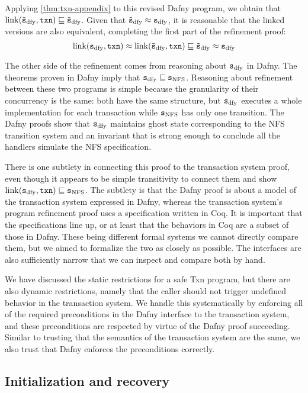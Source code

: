 Applying \cref{thm:txn-appendix} to this revised Dafny program, we obtain that
$\mathrm{link}(\tilde{\texttt{s}}_{\mathrm{dfy}}, \texttt{txn}) \sqsubseteq \tilde{\texttt{s}}_{\mathrm{dfy}}$. Given that $\tilde{\texttt{s}}_{\mathrm{dfy}} \approx \texttt{s}_{\mathrm{dfy}}$, it is
reasonable that the linked versions are also equivalent, completing the first
part of the refinement proof:
\[
  \mathrm{link}(\texttt{s}_{\mathrm{dfy}}, \texttt{txn}) \approx \mathrm{link}(\tilde{\texttt{s}}_{\mathrm{dfy}}, \texttt{txn}) \sqsubseteq \tilde{\texttt{s}}_{\mathrm{dfy}} \approx \texttt{s}_{\mathrm{dfy}}
\]

The other side of the refinement comes from reasoning about $\texttt{s}_{\mathrm{dfy}}$ in Dafny.
The theorems proven in Dafny imply that $\texttt{s}_{\mathrm{dfy}} \sqsubseteq \texttt{s}_{\mathrm{NFS}}$. Reasoning about
refinement between these two programs is simple because the granularity of their
concurrency is the same: both have the same structure, but $\texttt{s}_{\mathrm{dfy}}$ executes a
whole implementation for each transaction while $\texttt{s}_{\mathrm{NFS}}$ has only one transition.
The Dafny proofs show that $\texttt{s}_{\mathrm{dfy}}$ maintains ghost state corresponding to the
NFS transition system and an invariant that is strong enough to conclude all the
handlers simulate the NFS specification.

There is one subtlety in connecting this proof to the transaction system proof,
even though it appears to be simple transitivity to connect them and show
$\mathrm{link}(\texttt{s}_{\mathrm{dfy}}, \texttt{txn}) \sqsubseteq \texttt{s}_{\mathrm{NFS}}$. The subtlety is that the Dafny proof is about a
model of the transaction system expressed in Dafny, whereas the transaction
system's program refinement proof uses a specification written in Coq. It is
important that the specifications line up, or at least that the behaviors in Coq
are a subset of those in Dafny. These being different formal systems we cannot
directly compare them, but we aimed to formalize the two as closely as possible.
The interfaces are also sufficiently narrow that we can inspect and compare both
by hand.

We have discussed the static restrictions for a safe Txn program, but there are
also dynamic restrictions, namely that the caller should not trigger undefined
behavior in the transaction system. We handle this systematically by enforcing
all of the required preconditions in the Dafny interface to the transaction
system, and these preconditions are respected by virtue of the Dafny proof
succeeding. Similar to trusting that the semantics of the transaction system are
the same, we also trust that Dafny enforces the preconditions correctly.

\subsection{Initialization and recovery}

